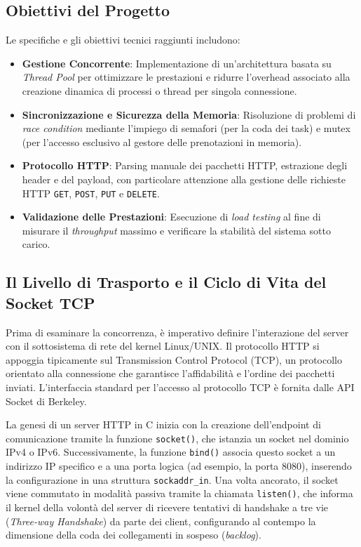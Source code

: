 \documentclass[a4paper,12pt]{article}
\begin{document}
\subsection{Obiettivi del Progetto}
Le specifiche e gli obiettivi tecnici raggiunti includono:
\begin{itemize}
    \item \textbf{Gestione Concorrente}: Implementazione di un'architettura basata su \textit{Thread Pool} per ottimizzare le prestazioni e ridurre l'overhead associato alla creazione dinamica di processi o thread per singola connessione.
    \item \textbf{Sincronizzazione e Sicurezza della Memoria}: Risoluzione di problemi di \textit{race condition} mediante l'impiego di semafori (per la coda dei task) e mutex (per l'accesso esclusivo al gestore delle prenotazioni in memoria).
    \item \textbf{Protocollo HTTP}: Parsing manuale dei pacchetti HTTP, estrazione degli header e del payload, con particolare attenzione alla gestione delle richieste HTTP \texttt{GET}, \texttt{POST}, \texttt{PUT} e \texttt{DELETE}.
    \item \textbf{Validazione delle Prestazioni}: Esecuzione di \textit{load testing} al fine di misurare il \textit{throughput} massimo e verificare la stabilità del sistema sotto carico.
\end{itemize}

\subsection{Il Livello di Trasporto e il Ciclo di Vita del Socket TCP}
Prima di esaminare la concorrenza, è imperativo definire l'interazione del server con il sottosistema di rete del kernel Linux/UNIX. Il protocollo HTTP si appoggia tipicamente sul Transmission Control Protocol (TCP), un protocollo orientato alla connessione che garantisce l'affidabilità e l'ordine dei pacchetti inviati. L'interfaccia standard per l'accesso al protocollo TCP è fornita dalle API Socket di Berkeley.

La genesi di un server HTTP in C inizia con la creazione dell'endpoint di comunicazione tramite la funzione \texttt{socket()}, che istanzia un socket nel dominio IPv4 o IPv6. Successivamente, la funzione \texttt{bind()} associa questo socket a un indirizzo IP specifico e a una porta logica (ad esempio, la porta 8080), inserendo la configurazione in una struttura \texttt{sockaddr\_in}. Una volta ancorato, il socket viene commutato in modalità passiva tramite la chiamata \texttt{listen()}, che informa il kernel della volontà del server di ricevere tentativi di handshake a tre vie (\textit{Three-way Handshake}) da parte dei client, configurando al contempo la dimensione della coda dei collegamenti in sospeso (\textit{backlog}).
\end{document}
